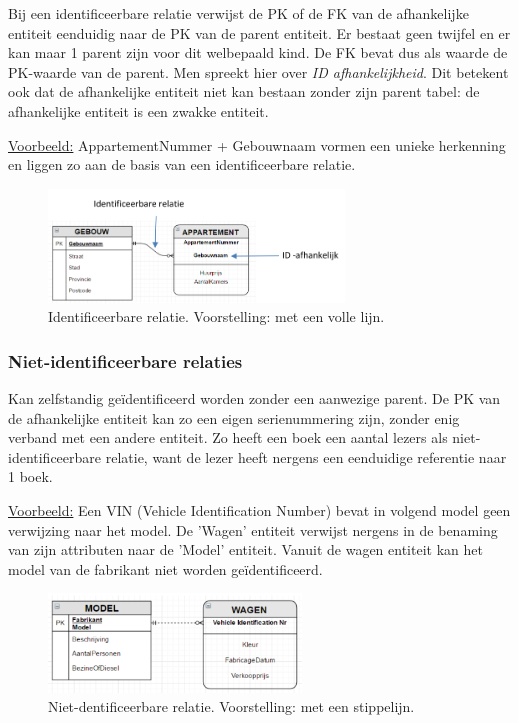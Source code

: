 \documentclass{article}
\begin{document}
Bij een identificeerbare relatie verwijst de PK of de FK van de afhankelijke entiteit eenduidig naar de PK van de parent entiteit.
Er bestaat geen twijfel en er kan maar 1 parent zijn voor dit welbepaald kind.
De FK bevat dus als waarde de PK-waarde van de parent. Men spreekt hier over \textit{ID afhankelijkheid}.
Dit betekent ook dat de afhankelijke entiteit niet kan bestaan zonder zijn parent tabel: de afhankelijke entiteit is een zwakke entiteit.

\underline{Voorbeeld:} AppartementNummer + Gebouwnaam vormen een unieke herkenning en liggen zo aan de basis van een identificeerbare relatie.

\begin{figure}[H]
    \centering
    \includegraphics[width=0.7\textwidth]{Screenshot_20200325_135140.png}
    \caption{Identificeerbare relatie. Voorstelling: met een volle lijn.}
\end{figure}

\subsubsection{Niet-identificeerbare relaties}
Kan zelfstandig geïdentificeerd worden zonder een aanwezige parent. De PK van de
afhankelijke entiteit kan zo een eigen serienummering zijn, zonder enig verband met
een andere entiteit. Zo heeft een boek een aantal lezers als niet-identificeerbare relatie,
want de lezer heeft nergens een eenduidige referentie naar 1 boek. 

\underline{Voorbeeld:} Een VIN (Vehicle Identification Number) bevat in volgend model geen
verwijzing naar het model. De 'Wagen' entiteit verwijst nergens in de benaming van zijn
attributen naar de 'Model' entiteit. Vanuit de wagen entiteit kan het model van de fabrikant
niet worden geïdentificeerd.

\begin{figure}[H]
    \centering
    \includegraphics[width=0.6\textwidth]{Screenshot_20200325_180636.png}
    \caption{Niet-dentificeerbare relatie. Voorstelling: met een stippelijn.}
\end{figure}
\end{document}
